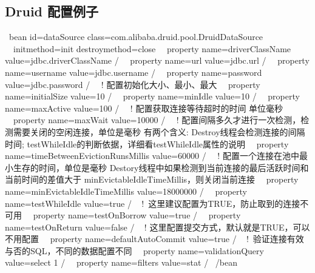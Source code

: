 \documentclass[a4,10pt,oneside,english]{sphinxmanual}
\begin{document}
\subsection{Druid 配置例子}
\label{\detokenize{interface/druid:id2}}
\begin{sphinxVerbatim}[commandchars=\\\{\}]
 \PYGZlt{}bean id=\PYGZdq{}dataSource\PYGZdq{} class=\PYGZdq{}com.alibaba.druid.pool.DruidDataSource\PYGZdq{}
  init\PYGZhy{}method=\PYGZdq{}init\PYGZdq{} destroy\PYGZhy{}method=\PYGZdq{}close\PYGZdq{}\PYGZgt{}
  \PYGZlt{}property name=\PYGZdq{}driverClassName\PYGZdq{} value=\PYGZdq{}\PYGZdl{}\PYGZob{}jdbc.driverClassName\PYGZcb{}\PYGZdq{} /\PYGZgt{}
  \PYGZlt{}property name=\PYGZdq{}url\PYGZdq{} value=\PYGZdq{}\PYGZdl{}\PYGZob{}jdbc.url\PYGZcb{}\PYGZdq{} /\PYGZgt{}
  \PYGZlt{}property name=\PYGZdq{}username\PYGZdq{} value=\PYGZdq{}\PYGZdl{}\PYGZob{}jdbc.username\PYGZcb{}\PYGZdq{} /\PYGZgt{}
  \PYGZlt{}property name=\PYGZdq{}password\PYGZdq{} value=\PYGZdq{}\PYGZdl{}\PYGZob{}jdbc.password\PYGZcb{}\PYGZdq{} /\PYGZgt{}
  \PYGZlt{}!\PYGZhy{}\PYGZhy{} 配置初始化大小、最小、最大 \PYGZhy{}\PYGZhy{}\PYGZgt{}
  \PYGZlt{}property name=\PYGZdq{}initialSize\PYGZdq{} value=\PYGZdq{}10\PYGZdq{} /\PYGZgt{}
  \PYGZlt{}property name=\PYGZdq{}minIdle\PYGZdq{} value=\PYGZdq{}10\PYGZdq{} /\PYGZgt{}
  \PYGZlt{}property name=\PYGZdq{}maxActive\PYGZdq{} value=\PYGZdq{}100\PYGZdq{} /\PYGZgt{}
  \PYGZlt{}!\PYGZhy{}\PYGZhy{} 配置获取连接等待超时的时间 单位毫秒\PYGZhy{}\PYGZhy{}\PYGZgt{}
  \PYGZlt{}property name=\PYGZdq{}maxWait\PYGZdq{} value=\PYGZdq{}10000\PYGZdq{} /\PYGZgt{}
  \PYGZlt{}!\PYGZhy{}\PYGZhy{} 配置间隔多久才进行一次检测，检测需要关闭的空闲连接，单位是毫秒
有两个含义:
Destroy线程会检测连接的间隔时间;
testWhileIdle的判断依据，详细看testWhileIdle属性的说明\PYGZhy{}\PYGZhy{}\PYGZgt{}
  \PYGZlt{}property name=\PYGZdq{}timeBetweenEvictionRunsMillis\PYGZdq{} value=\PYGZdq{}60000\PYGZdq{} /\PYGZgt{}
  \PYGZlt{}!\PYGZhy{}\PYGZhy{} 配置一个连接在池中最小生存的时间，单位是毫秒
Destory线程中如果检测到当前连接的最后活跃时间和当前时间的差值大于
minEvictableIdleTimeMillis，则关闭当前连接 \PYGZhy{}\PYGZhy{}\PYGZgt{}
  \PYGZlt{}property name=\PYGZdq{}minEvictableIdleTimeMillis\PYGZdq{} value=\PYGZdq{}18000000\PYGZdq{} /\PYGZgt{}
  \PYGZlt{}property name=\PYGZdq{}testWhileIdle\PYGZdq{} value=\PYGZdq{}true\PYGZdq{} /\PYGZgt{}
  \PYGZlt{}!\PYGZhy{}\PYGZhy{} 这里建议配置为TRUE，防止取到的连接不可用 \PYGZhy{}\PYGZhy{}\PYGZgt{}
  \PYGZlt{}property name=\PYGZdq{}testOnBorrow\PYGZdq{} value=\PYGZdq{}true\PYGZdq{} /\PYGZgt{}
  \PYGZlt{}property name=\PYGZdq{}testOnReturn\PYGZdq{} value=\PYGZdq{}false\PYGZdq{} /\PYGZgt{}
  \PYGZlt{}!\PYGZhy{}\PYGZhy{} 这里配置提交方式，默认就是TRUE，可以不用配置 \PYGZhy{}\PYGZhy{}\PYGZgt{}
  \PYGZlt{}property name=\PYGZdq{}defaultAutoCommit\PYGZdq{} value=\PYGZdq{}true\PYGZdq{} /\PYGZgt{}
  \PYGZlt{}!\PYGZhy{}\PYGZhy{} 验证连接有效与否的SQL，不同的数据配置不同 \PYGZhy{}\PYGZhy{}\PYGZgt{}
  \PYGZlt{}property name=\PYGZdq{}validationQuery\PYGZdq{} value=\PYGZdq{}select 1 \PYGZdq{} /\PYGZgt{}
  \PYGZlt{}property name=\PYGZdq{}filters\PYGZdq{} value=\PYGZdq{}stat\PYGZdq{} /\PYGZgt{}
 \PYGZlt{}/bean\PYGZgt{}
\end{sphinxVerbatim}
\end{document}

